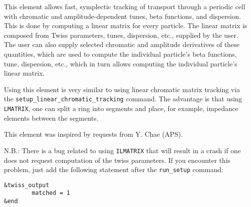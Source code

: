 This element allows fast, symplectic tracking of transport through a
periodic cell with chromatic and amplitude-dependent tunes, beta
functions, and dispersion.  This is done by computing a linear matrix
for every particle.  The linear matrix is composed from Twiss
parameters, tunes, dispersion, etc., supplied by the user.  The user
can also supply selected chromatic and amplitude derivatives of these
quantities, which are used to compute the individual particle's beta
functions, tune, dispersion, etc., which in turn allows computing the
individual particle's linear matrix.

Using this element is very similar to using linear chromatic matrix
tracking via the \verb|setup_linear_chromatic_tracking| command.
The advantage is that using {\tt LMATRIX}, one can split a ring into segments
and place, for example, impedance elements between the segments.

This element was inspired by requests from Y. Chae (APS).

N.B.: There is a bug related to using {\tt ILMATRIX} that will result in a crash
if one does not request computation of the twiss parameters. If you encounter this
problem, just add the following statement after the \verb|run_setup| command:
\begin{verbatim}
&twiss_output
        matched = 1
&end
\end{verbatim}
